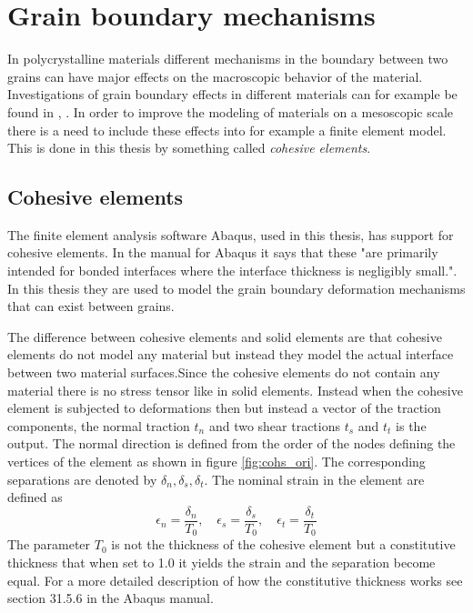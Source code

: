 \documentclass[grain_boundary_law.tex]{subfiles}
\begin{document}
\FloatBarrier

\chapter{Grain boundary mechanisms}


In polycrystalline materials different mechanisms in the boundary between two grains can have major effects on the macroscopic behavior of the material. Investigations of grain boundary effects in different materials can for example be found in \cite{eff_grain}, \cite{grain_poly}. In order to improve the modeling of materials on a mesoscopic scale there is a need to include these effects into for example a finite element model. This is done in this thesis by something called \textit{cohesive elements}.

\section{Cohesive elements}

The finite element analysis software Abaqus, used in this thesis, has support for cohesive elements. In the manual for Abaqus it says that these "are primarily intended for bonded interfaces where the interface thickness is negligibly small.". In this thesis they are used to model the grain boundary deformation mechanisms that can exist between grains.

The difference between cohesive elements and solid elements are that cohesive elements do not model any material but instead they model the actual interface between two material surfaces.Since the cohesive elements do not contain any material there is no stress tensor like in solid elements. Instead when the cohesive element is subjected to deformations then  but instead a vector of the traction components, the normal traction $t_n$ and two shear tractions $t_s$ and $t_t$ is the output. The normal direction is defined from the order of the nodes defining the vertices of the element as shown in figure \ref{fig:cohs_ori}. The corresponding separations are denoted by $\delta_n, \delta_s, \delta_t$. The nominal strain in the element are defined as
%
\[ \epsilon_n = \frac{\delta_n}{T_0}, \quad \epsilon_s = \frac{\delta_s}{T_0}, \quad \epsilon_t = \frac{\delta_t}{T_0}  \]
%
The parameter $T_0$ is not the thickness of the cohesive element but a constitutive thickness that when set to 1.0 it yields the strain and the separation become equal. For a more detailed description of how the constitutive thickness works see section 31.5.6 in the Abaqus manual.
\end{document}
